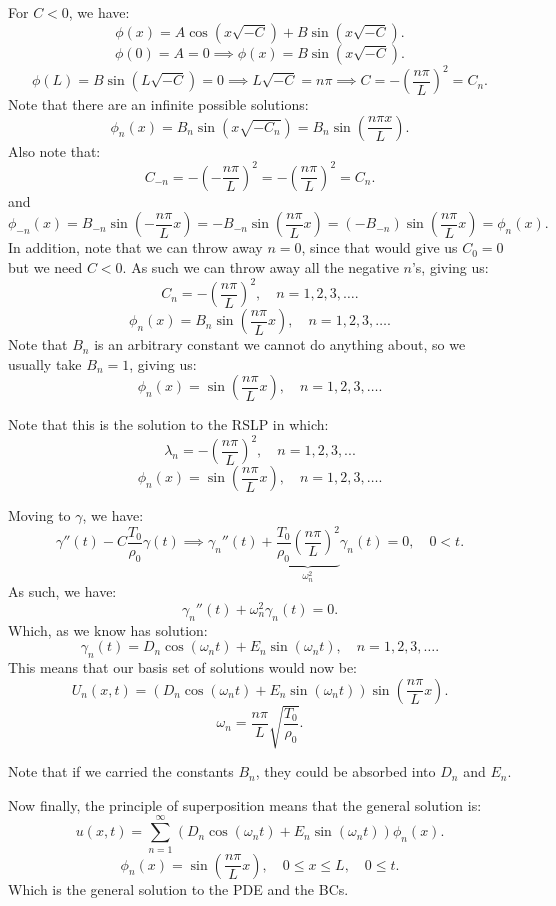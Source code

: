 \documentclass[../main/main.tex]{subfiles}
\begin{document}
For $C<0$, we have: \[
	\phi(x) = A \cos(x\sqrt{-C} ) + B \sin (x \sqrt{ -C} ) 
.\] \[
\phi(0) = A = 0 \implies \phi(x) = B \sin(x \sqrt{-C} )
.\] \[
\phi(L) = B \sin(L\sqrt{-C} ) = 0 \implies L\sqrt{-C}  = n\pi \implies C = -\left( \frac{n\pi}{L} \right) ^2 = C_n
.\] Note that there are an infinite possible solutions: \[
\phi_n(x) = B_n \sin(x \sqrt{-C_n} ) = B_n \sin \left( \frac{n\pi x}{L} \right) 
.\] 
Also note that: \[
	C_{-n} = -\left( - \frac{n\pi}{L} \right) ^2 = - \left( \frac{n\pi}{L} \right) ^2 = C_n
.\] and \[
\phi_{-n}(x) = B_{-n}\sin\left( - \frac{n\pi}{L} x \right) = -B_{-n}\sin \left( \frac{n\pi}{L}x \right) = \left( -B_{-n} \right) \sin\left( \frac{n\pi}{L}x \right)  = \phi_{n}(x)
.\] In addition, note that we can throw away $n=0$, since that would give us $C_0 = 0$ but we need $C<0$. As such we can throw away all the negative  $n$'s, giving us: \[
C_n = -\left( \frac{n\pi}{L} \right) ^2,\quad n = 1,2,3,\ldots
.\] \[
\phi_n(x) = B_n \sin\left(\frac{n\pi}{L}x\right), \quad n = 1,2,3,\ldots
.\] Note that $B_n$ is an arbitrary constant we cannot do anything about, so we usually take $B_n=1$, giving us: \[
\phi_n(x) = \sin\left(\frac{n\pi}{L}x\right), \quad n = 1,2,3,\ldots
.\]
\begin{remark}
	Note that this is the solution to the RSLP in which: \[
		\lambda_n = - \left( \frac{n\pi}{L} \right) ^2, \quad n=1,2,3,..
	.\] \[
	\phi_n(x) = \sin\left( \frac{n\pi}{L}x \right) , \quad n=1,2,3,\ldots
	.\] 
\end{remark}
Moving to $\gamma$, we have:  \[
	\gamma''(t) - C \frac{T_0}{\rho_0}\gamma(t) \implies \gamma_n''(t) + \underbrace{\frac{T_0}{\rho_0}\left( \frac{n\pi}{L} \right) ^2}_{\omega_n^2} \gamma_n(t) = 0, \quad 0 < t
.\] As such, we have: \[
\gamma_n''(t) + \omega_n^2\gamma_n(t) = 0
.\] Which, as we know has solution: \[
\gamma_n(t) = D_n \cos(\omega_n t) + E_n \sin(\omega_n t) , \quad n = 1 , 2, 3, \ldots
.\] This means that our basis set of solutions would now be: \[
U_n(x,t) = \left( D_n \cos(\omega_n t) + E_n \sin(\omega_n t) \right) \sin\left( \frac{n\pi}{L}x \right) 
.\] \[
\omega_n = \frac{n\pi}{L}\sqrt{ \frac{T_0}{\rho_0}} 
.\] 
\begin{remark}
	Note that if we carried the constants $B_n$, they could be absorbed into $D_n$ and $E_n$.
\end{remark}

Now finally, the principle of superposition means that the general solution is: \[
	u(x,t) = \sum_{n=1}^{\infty} \left( D_n \cos(\omega_nt) + E_n \sin(\omega_nt) \right) \phi_n(x)
.\] \[
\phi_n(x) = \sin\left( \frac{n\pi}{L} x \right) ,\quad 0 \le  x \le  L, \quad 0 \le t
.\] Which is the general solution to the PDE and the BCs.
\end{document}
